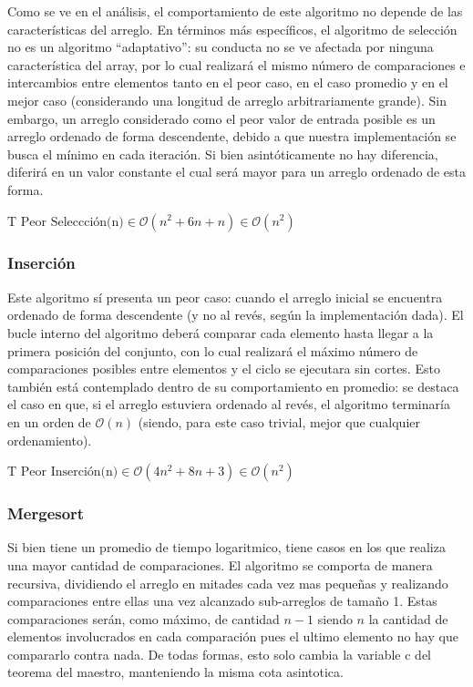 \documentclass[article,a4paper]{article}
\begin{document}
Como se ve en el análisis, el comportamiento de este algoritmo no depende de las características del arreglo. En términos más específicos, el algoritmo de selección no es un algoritmo “adaptativo”: su conducta no se ve afectada por ninguna característica del array, por lo cual realizará el mismo número de comparaciones e intercambios entre elementos tanto en el peor caso, en el caso promedio y en el mejor caso (considerando una longitud de arreglo arbitrariamente grande). Sin embargo, un arreglo considerado como el peor valor de entrada posible es un arreglo ordenado de forma descendente, debido a que nuestra implementación se busca el mínimo en cada iteración. Si bien asintóticamente no hay diferencia, diferirá en un valor constante el cual será mayor para un arreglo ordenado de esta forma.

$\mbox{T Peor Seleccción(n)} \in \mathcal O(n^2 + 6n + n) \in \mathcal O(n^2)$ 


\subsubsection{Inserción}

Este algoritmo sí presenta un peor caso: cuando el arreglo inicial se encuentra ordenado de forma descendente (y no al revés, según la implementación dada). El bucle interno del algoritmo deberá comparar cada elemento hasta llegar a la primera posición del conjunto, con lo cual realizará el máximo número de comparaciones posibles entre elementos y el ciclo se ejecutara sin cortes. Esto también está contemplado dentro de su comportamiento en promedio: se destaca el caso en que, si el arreglo estuviera ordenado al revés, el algoritmo terminaría en un orden de $\mathcal O(n)$ (siendo, para este caso trivial, mejor que cualquier ordenamiento).

$\mbox{T Peor Inserción(n)} \in \mathcal O(4n^2 + 8n + 3) \in \mathcal O(n^2)$

\subsubsection{Mergesort}

Si bien tiene un promedio de tiempo logaritmico, tiene casos en los que realiza una mayor cantidad de comparaciones. El algoritmo se comporta de manera recursiva, dividiendo el arreglo en mitades cada vez mas pequeñas y realizando comparaciones entre ellas una vez alcanzado sub-arreglos de tamaño 1. Estas comparaciones serán, como máximo, de cantidad $n-1$ siendo $n$ la cantidad de elementos involucrados en cada comparación pues el ultimo elemento no hay que compararlo contra nada. De todas formas,  esto solo cambia la variable c del teorema del maestro, manteniendo la misma cota asintotica.
\end{document}
